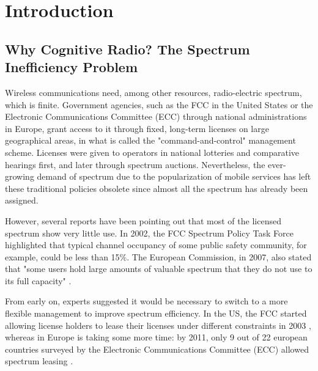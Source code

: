\graphicspath{ {img/SPEC_MAN/} }
\chapter{Introduction}
\section{Why Cognitive Radio? The Spectrum Inefficiency Problem}
Wireless communications need, among other resources, radio-electric spectrum, which is finite. 
Government agencies, such as the FCC in the United States or the Electronic Communications Committee (ECC) through national administrations in Europe, grant access to it through fixed, long-term licenses on large geographical areas, in what is called the "command-and-control" management scheme. 
Licenses were given to operators in national lotteries and comparative hearings first, and later through spectrum auctions. %
Nevertheless, the ever-growing demand of spectrum due to the popularization of mobile services has left these traditional policies obsolete since almost all the spectrum has already been assigned. %

However, several reports have been pointing out that most of the licensed spectrum show very little use. In 2002, the FCC Spectrum Policy Task Force \cite{ref:FCC2002} highlighted that typical channel occupancy of some public safety community, for example, could be less than 15\%. The European Commission, in 2007, also stated that "some users hold large amounts of valuable spectrum that they do not use to its full capacity" \cite{ref:Commission2007}.

From early on, experts suggested \cite{ref:Valletti2001} it would be necessary to switch to a more flexible management to improve spectrum efficiency. In the US, the FCC started allowing license holders to lease their licenses under different constraints in 2003 \cite{ref:Mayo2010}, whereas in Europe is taking some more time: by 2011, only 9 out of 22 european countries surveyed by the Electronic Communications Committee (ECC) allowed spectrum leasing \cite{ref:ECC2011}. %

